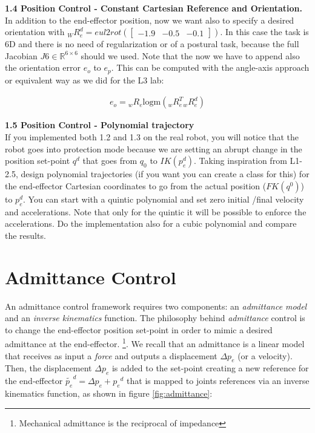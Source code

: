 \documentclass[11pt]{article}
\newcommand{\Rnum}{\mathbb{R}} %
\newcommand{\mat}[1]{\ensuremath{\begin{bmatrix}#1\end{bmatrix}}}	%
\begin{document}
\textbf{1.4 Position Control - Constant Cartesian Reference and Orientation.}\\
In addition to the end-effector position, now we want also to specify a desired orientation with ${}_WR_e^d = eul2rot(\mat{-1.9& -0.5& -0.1})$.
In this case the task is 6D and there is no need of regularization or of a postural task, because the full Jacobian $J6 \in \Rnum^{6 \times 6}$ should we used. 
Note that the now we have to append also  the orientation error $e_o$  to $e_p$. This can be computed with the angle-axis approach or equivalent way as we did for the L3 lab: 

\begin{align}
e_o = {}_wR_e \text{logm}({}_wR_e^T {}_wR_e^d)
\end{align}


\textbf{1.5 Position Control - Polynomial trajectory}\\
If you implemented both 1.2 and 1.3 on the real robot, you will notice that the robot goes into protection mode because we are setting an abrupt change in the position set-point $q^d$ that goes from $q_0$ to $IK(p_e^d)$.
Taking inspiration from L1-2.5, design polynomial  trajectories (if you want you can create a class for this) for the end-effector Cartesian coordinates to go from the actual position ($FK(q^0)$) to $p_e^d$. You can start with a quintic polynomial and set zero initial /final velocity and accelerations. Note that only for the quintic it will be possible to enforce the accelerations. Do the implementation also for a cubic polynomial and compare the results.\\


\section{Admittance Control}
An admittance control framework requires two components: an \textit{admittance model} and an \textit{inverse kinematics} function.
The philosophy behind \textit{admittance} control is to change the end-effector position set-point in order to mimic a desired admittance at the end-effector. 
\footnote{Mechanical admittance is the reciprocal of impedance}. We recall that an admittance is a linear model that receives  as input a \textit{force} and 
outputs a displacement $\Delta p_e$ (or a velocity). Then, the displacement $\Delta p_e$ is added to the set-point creating a new reference for the end-effector $\tilde{p_e}^d = \Delta p_e + {p_e}^d$  that is mapped to joints references via an inverse kinematics function, as shown in figure \ref{fig:admittance}:\\
\end{document}
